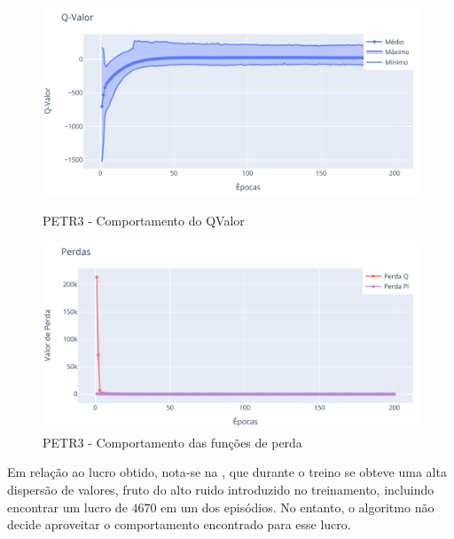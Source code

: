 \begin{figure}[htbp]
    \centering 
    \begin{minipage}[b]{0.45\linewidth}
        \includegraphics[width=\linewidth]{img/ddpg/petr3/clean/qval}
        \caption{PETR3 - Comportamento do QValor} 
        \label{ptr_clean_qval}
    \end{minipage}
    \quad
    \begin{minipage}[b]{0.45\linewidth}
        \includegraphics[width=\linewidth]{img/ddpg/petr3/clean/loss}
        \caption{PETR3 - Comportamento das funções de perda}
        \label{petr_clean_loss}
    \end{minipage}
\end{figure}

Em relação ao lucro obtido, nota-se na , que durante o treino se obteve uma alta dispersão de valores, fruto do alto ruido introduzido no treinamento, incluindo encontrar um lucro de $4670$ em um dos episódios. No entanto, o algoritmo não decide aproveitar o comportamento encontrado para esse lucro. 


